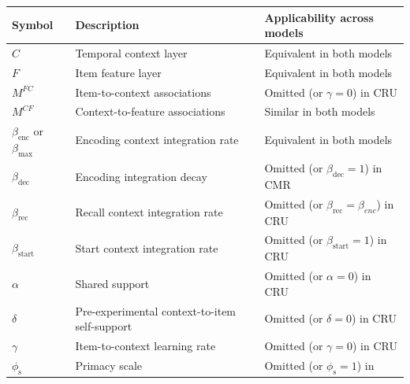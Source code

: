 \documentclass[
  man,
  floatsintext,
  longtable,
  nolmodern,
  notxfonts,
  notimes,
  draftfirst,
  colorlinks=true,linkcolor=blue,citecolor=blue,urlcolor=blue]{apa7}
\begin{document}
\begin{table}

{\caption{{Parameters and structures specifying CRU and
CMR.}{\label{tbl-parameters}}}
\vspace{-20pt}}

\begin{longtable}[]{@{}
  >{\raggedright\arraybackslash}p{}
  >{\raggedright\arraybackslash}p{}
  >{\raggedright\arraybackslash}p{}@{}}
\toprule\noalign{}
\begin{minipage}[b]{\linewidth}\raggedright
Symbol
\end{minipage} & \begin{minipage}[b]{\linewidth}\raggedright
Description
\end{minipage} & \begin{minipage}[b]{\linewidth}\raggedright
Applicability across models
\end{minipage} \\
\midrule\noalign{}
\endhead
\bottomrule\noalign{}
\endlastfoot
\(C\) & Temporal context layer & Equivalent in both models \\
\(F\) & Item feature layer & Equivalent in both models \\
\(M^{FC}\) & Item-to-context associations & Omitted (or \(\gamma=0\)) in
CRU \\
\(M^{CF}\) & Context-to-feature associations & Similar in both models \\
\(\beta_\text{enc}\) or \(\beta_\text{max}\) & Encoding context
integration rate & Equivalent in both models \\
\(\beta_\text{dec}\) & Encoding integration decay & Omitted (or
\(\beta_\text{dec}=1\)) in CMR \\
\(\beta_\text{rec}\) & Recall context integration rate & Omitted (or
\(\beta_\text{rec}=\beta_{enc}\)) in CRU \\
\(\beta_\text{start}\) & Start context integration rate & Omitted (or
\(\beta_\text{start}=1\)) in CRU \\
\(\alpha\) & Shared support & Omitted (or \(\alpha=0\)) in CRU \\
\(\delta\) & Pre-experimental context-to-item self-support & Omitted (or
\(\delta=0\)) in CRU \\
\(\gamma\) & Item-to-context learning rate & Omitted (or \(\gamma=0\))
in CRU \\
\(\phi_\text{s}\) & Primacy scale & Omitted (or \(\phi_\text{s}=1\)) in

\end{longtable}
\end{table}
\end{document}
